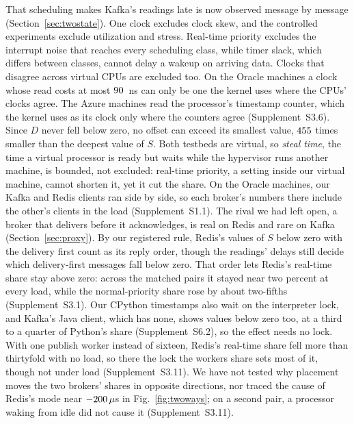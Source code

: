 \documentclass[10pt,journal,compsoc]{IEEEtran}
\newcommand{\kafka}{Kafka}
\newcommand{\redis}{Redis}
\begin{document}
That scheduling makes \kafka{}'s readings late is now observed message by message
(Section~\ref{sec:twostate}). One clock excludes clock skew, and the controlled experiments exclude
utilization and stress. Real-time priority excludes the interrupt noise that reaches every
scheduling class, while timer slack, which differs between classes, cannot delay a wakeup on
arriving data. Clocks that disagree across virtual CPUs are excluded too. On the Oracle machines a
clock whose read costs at most $90$~ns can only be one the kernel uses where the
CPUs' clocks agree. The Azure machines read the processor's timestamp counter, which the kernel uses
as its clock only where the counters agree (Supplement~S3.6). Since $D$ never fell below zero, no
offset can exceed its smallest value, $455$ times smaller than the deepest value of
$S$. Both testbeds are virtual, so \emph{steal time}, the time a virtual processor is ready but
waits while the hypervisor runs another machine, is bounded, not excluded: real-time priority, a
setting inside our virtual machine, cannot shorten it, yet it cut the share. On the Oracle
machines, our \kafka{} and \redis{} clients ran side by side, so each broker's numbers there
include the other's clients in the load (Supplement~S1.1). The rival we had left open, a broker
that delivers before it acknowledges, is real on \redis{} and rare on \kafka{}
(Section~\ref{sec:proxy}). By our registered rule, \redis{}'s values of $S$ below zero with the
delivery first count as its reply order, though the readings' delays still decide which
delivery-first messages fall below zero. That order lets \redis{}'s real-time share stay above zero:
across the matched pairs it stayed near two percent at every load, while the normal-priority share rose by about two-fifths (Supplement~S3.1). Our CPython
timestamps also wait on the interpreter lock, and \kafka{}'s Java client, which has none, shows
values below zero too, at a third to a quarter of Python's share (Supplement~S6.2), so the effect
needs no lock. With one publish worker instead of sixteen, \redis{}'s real-time share fell more than thirtyfold with no load, so there the lock the workers share
sets most of it, though not under load (Supplement~S3.11). We have not tested why placement moves
the two brokers' shares in opposite directions, nor traced the cause of \redis{}'s mode near
$-200\,\mu$s in Fig.~\ref{fig:twoways}; on a second pair, a processor waking from idle
did not cause it (Supplement~S3.11).
\end{document}
